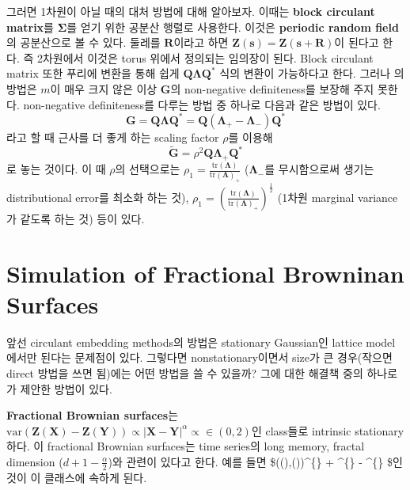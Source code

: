 \documentclass[b5paper,]{scrbook}
\theoremstyle{plain}
\theoremstyle{definition}
\numberwithin{equation}{section}
\begin{document}
그러면 1차원이 아닐 때의 대처 방법에 대해 알아보자. 이때는 \textbf{block circulant matrix}를 \(\boldsymbol{\Sigma}\)를 얻기 위한 공분산 행렬로 사용한다. 이것은 \textbf{periodic random field}의 공분산으로 볼 수 있다. 둘레를 \(\mathbf{R}\)이라고 하면 \(\mathbf{Z}(\mathbf{s})=\mathbf{Z}(\mathbf{s+R})\)이 된다고 한다. 즉 2차원에서 이것은 torus 위에서 정의되는 임의장이 된다. Block circulant matrix 또한 푸리에 변환을 통해 쉽게 \(\mathbf{Q}\boldsymbol{\Lambda}\mathbf{Q}^{*}\) 식의 변환이 가능하다고 한다. 그러나 \citep{Chan1997}의 방법은 \(m\)이 매우 크지 않은 이상 \(\mathbf{G}\)의 non-negative definiteness를 보장해 주지 못한다. non-negative definiteness를 다루는 방법 중 하나로 다음과 같은 방법이 있다.
\[\mathbf{G}=\mathbf{Q}\boldsymbol{\Lambda}\mathbf{Q}^{*}=\mathbf{Q}(\boldsymbol{\Lambda}_{+}-\boldsymbol{\Lambda}_{-})\mathbf{Q}^{*}\]
라고 할 때 근사를 더 좋게 하는 scaling factor \(\rho\)를 이용해
\[\tilde{\mathbf{G}}=\rho^{2}\mathbf{Q}\boldsymbol{\Lambda}_{+}\mathbf{Q}^{*}\]
로 놓는 것이다. 이 때 \(\rho\)의 선택으로는 \(\rho_{1}=\frac{\text{tr}(\boldsymbol{\Lambda})}{\text{tr}(\boldsymbol{\Lambda})_{+}}\) (\(\boldsymbol{\Lambda}_{-}\)를 무시함으로써 생기는 distributional error를 최소화 하는 것), \(\rho_{1}=(\frac{\text{tr}(\boldsymbol{\Lambda})}{\text{tr}(\boldsymbol{\Lambda})_{+}})^{\frac{1}{2}}\) (1차원 marginal variance가 같도록 하는 것) 등이 있다.

\hypertarget{simulation-of-fractional-browninan-surfaces}{%
\section{Simulation of Fractional Browninan Surfaces}\label{simulation-of-fractional-browninan-surfaces}}

앞선 circulant embedding methods의 방법은 stationary Gaussian인 lattice model에서만 된다는 문제점이 있다. 그렇다면 nonstationary이면서 size가 큰 경우(작으면 direct 방법을 쓰면 됨)에는 어떤 방법을 쓸 수 있을까? 그에 대한 해결책 중의 하나로 \citep{Stein2002}가 제안한 방법이 있다.

\textbf{Fractional Brownian surfaces}는 \(\text{var}(\mathbf{Z}(\mathbf{X})-\mathbf{Z}(\mathbf{Y})) \propto |\mathbf{X}-\mathbf{Y}|^{\alpha} \propto \in (0,2)\)인 class들로 intrinsic stationary하다. 이 fractional Brownian surfaces는 time series의 long memory, fractal dimension (\(d+1-\frac{\alpha}{2}\))와 관련이 있다고 한다. 예를 들면
\$((),())\propto \textbar{}\textbar{}\^{}\{\alpha\} + \textbar{}\textbar{}\^{}\{\alpha\} - \textbar{}\textbar{}\^{}\{\alpha\} \$인 것이 이 클래스에 속하게 된다.
\end{document}
